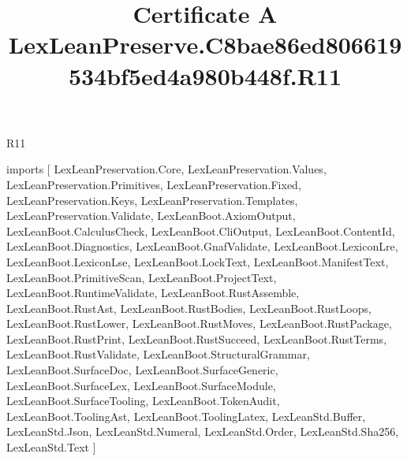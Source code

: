 \begin{lexlean}{R11}
\title{Certificate A LexLeanPreserve.C8bae86ed806619534bf5ed4a980b448f.R11}
\begin{coremodule}
imports [
  LexLeanPreservation.Core,
  LexLeanPreservation.Values,
  LexLeanPreservation.Primitives,
  LexLeanPreservation.Fixed,
  LexLeanPreservation.Keys,
  LexLeanPreservation.Templates,
  LexLeanPreservation.Validate,
  LexLeanBoot.AxiomOutput,
  LexLeanBoot.CalculusCheck,
  LexLeanBoot.CliOutput,
  LexLeanBoot.ContentId,
  LexLeanBoot.Diagnostics,
  LexLeanBoot.GnafValidate,
  LexLeanBoot.LexiconLre,
  LexLeanBoot.LexiconLse,
  LexLeanBoot.LockText,
  LexLeanBoot.ManifestText,
  LexLeanBoot.PrimitiveScan,
  LexLeanBoot.ProjectText,
  LexLeanBoot.RuntimeValidate,
  LexLeanBoot.RustAssemble,
  LexLeanBoot.RustAst,
  LexLeanBoot.RustBodies,
  LexLeanBoot.RustLoops,
  LexLeanBoot.RustLower,
  LexLeanBoot.RustMoves,
  LexLeanBoot.RustPackage,
  LexLeanBoot.RustPrint,
  LexLeanBoot.RustSucceed,
  LexLeanBoot.RustTerms,
  LexLeanBoot.RustValidate,
  LexLeanBoot.StructuralGrammar,
  LexLeanBoot.SurfaceDoc,
  LexLeanBoot.SurfaceGeneric,
  LexLeanBoot.SurfaceLex,
  LexLeanBoot.SurfaceModule,
  LexLeanBoot.SurfaceTooling,
  LexLeanBoot.TokenAudit,
  LexLeanBoot.ToolingAst,
  LexLeanBoot.ToolingLatex,
  LexLeanStd.Buffer,
  LexLeanStd.Json,
  LexLeanStd.Numeral,
  LexLeanStd.Order,
  LexLeanStd.Sha256,
  LexLeanStd.Text
]


\end{coremodule}
\end{lexlean}
